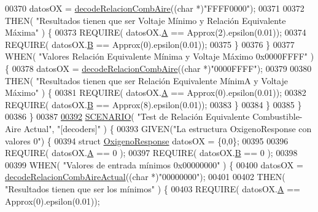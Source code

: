 \begin{DoxyCode}
{00370             datosOX = \hyperlink{decoders_8cpp_a363bd4f505969098be58a175f02b9b50}{decodeRelacionCombAire}((\textcolor{keywordtype}{char} *)\textcolor{stringliteral}{"FFFF0000"});
00371 
00372             THEN( \textcolor{stringliteral}{"Resultados tienen que ser Voltaje Mínimo y Relación Equivalente Máxima"} ) \{
00373                 REQUIRE( datosOX.\hyperlink{structOxigenoResponse_a068c403e5746226cf22bb020b4c786d3}{A} == Approx(2).epsilon(0.01));
00374                 REQUIRE( datosOX.\hyperlink{structOxigenoResponse_a96b19152dd001e19d1351e2d97f22736}{B} == Approx(0).epsilon(0.01));
00375             \}
00376         \}
00377         WHEN( \textcolor{stringliteral}{"Valores Relación Equivalente Mínima y Voltaje Máximo 0x0000FFFF"} ) \{
00378             datosOX = \hyperlink{decoders_8cpp_a363bd4f505969098be58a175f02b9b50}{decodeRelacionCombAire}((\textcolor{keywordtype}{char} *)\textcolor{stringliteral}{"0000FFFF"});
00379 
00380             THEN( \textcolor{stringliteral}{"Resultados tienen que ser Relación Equivalente MínimA y Voltaje Máximo"} ) \{
00381                 REQUIRE( datosOX.\hyperlink{structOxigenoResponse_a068c403e5746226cf22bb020b4c786d3}{A} == Approx(0).epsilon(0.01));
00382                 REQUIRE( datosOX.\hyperlink{structOxigenoResponse_a96b19152dd001e19d1351e2d97f22736}{B} == Approx(8).epsilon(0.01));
00383             \}
00384         \}
00385     \}
00386 \}
00387 
\hyperlink{UnitTestCase_8cpp_ab8cb04c98de551d82acba45293028c77}{00392} \hyperlink{UnitTestCase_8cpp_aa6afb62ebdd4c3e07996c995f623eb6b}{SCENARIO}( \textcolor{stringliteral}{"Test de Relación Equivalente Combustible-Aire Actual"}, \textcolor{stringliteral}{"[decoders]"} ) \{
00393     GIVEN(\textcolor{stringliteral}{"La estructura OxigenoResponse con valores 0"}) \{
00394         \textcolor{keyword}{struct }\hyperlink{structOxigenoResponse}{OxigenoResponse} datosOX = \{0,0\};
00395 
00396         REQUIRE( datosOX.\hyperlink{structOxigenoResponse_a068c403e5746226cf22bb020b4c786d3}{A} == 0 );
00397         REQUIRE( datosOX.\hyperlink{structOxigenoResponse_a96b19152dd001e19d1351e2d97f22736}{B} == 0 );
00398 
00399         WHEN( \textcolor{stringliteral}{"Valores de entrada mínimos 0x00000000"} ) \{
00400             datosOX = \hyperlink{decoders_8cpp_a4cedb500095b25b3d4fff382094b0eb9}{decodeRelacionCombAireActual}((\textcolor{keywordtype}{char} *)\textcolor{stringliteral}{"00000000"});
00401 
00402             THEN( \textcolor{stringliteral}{"Resultados tienen que ser los mínimos"} ) \{
00403                 REQUIRE( datosOX.\hyperlink{structOxigenoResponse_a068c403e5746226cf22bb020b4c786d3}{A} == Approx(0).epsilon(0.01));
}
\end{DoxyCode}
